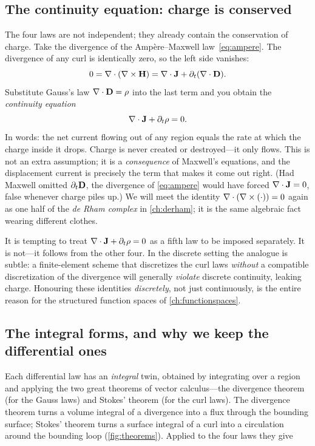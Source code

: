 \subsection{The continuity equation: charge is conserved}

The four laws are not independent; they already contain the conservation of
charge. Take the divergence of the Amp\`ere--Maxwell law~\eqref{eq:ampere}. The
divergence of any curl is identically zero, so the left side vanishes:
\[
  0 = \nabla\cdot(\nabla\times\mathbf{H}) = \nabla\cdot\mathbf{J} + \partial_t(\nabla\cdot\mathbf{D}).
\]
Substitute Gauss's law $\nabla\cdot\mathbf{D}=\rho$ into the last term and you obtain the
\emph{continuity equation}
\begin{equation}
  \nabla\cdot\mathbf{J} + \partial_t\rho = 0. \label{eq:continuity}
\end{equation}
In words: the net current flowing out of any region equals the rate at which
the charge inside it drops. Charge is never created or destroyed---it only
flows. This is not an extra assumption; it is a \emph{consequence} of Maxwell's
equations, and the displacement current is precisely the term that makes it
come out right. (Had Maxwell omitted $\partial_t\mathbf{D}$, the divergence of
\eqref{eq:ampere} would have forced $\nabla\cdot\mathbf{J}=0$, false whenever charge piles
up.) We will meet the identity $\nabla\cdot(\nabla\times(\cdot))=0$ again as one half of the
\emph{de Rham complex} in \cref{ch:derham}; it is the same algebraic fact wearing
different clothes.

\begin{pitfall}
It is tempting to treat $\nabla\cdot\mathbf{J}+\partial_t\rho=0$ as a fifth law to be imposed
separately. It is not---it follows from the other four. In the discrete setting
the analogue is subtle: a finite-element scheme that discretizes the curl laws
\emph{without} a compatible discretization of the divergence will generally
\emph{violate} discrete continuity, leaking charge. Honouring these identities
\emph{discretely}, not just continuously, is the entire reason for the
structured function spaces of \cref{ch:functionspaces}.
\end{pitfall}

\subsection{The integral forms, and why we keep the differential ones}
\label{sec:integral}

Each differential law has an \emph{integral} twin, obtained by integrating over
a region and applying the two great theorems of vector calculus---the
divergence theorem (for the Gauss laws) and Stokes' theorem (for the curl
laws). The divergence theorem turns a volume integral of a divergence into a
flux through the bounding surface; Stokes' theorem turns a surface integral of a
curl into a circulation around the bounding loop (\cref{fig:theorems}). Applied
to the four laws they give

